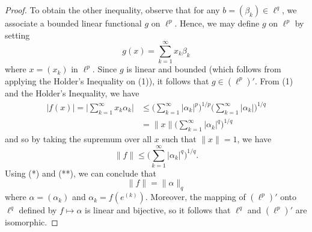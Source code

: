 \documentclass[a4paper]{article}
\begin{document}
\begin{proof}
To obtain the other inequality, observe that for any \( b = ({\beta}_{k}) \in \ell^{q} \), we associate a bounded linear functional \( g  \) on \( \ell^{p} \). Hence, we may define \( g  \) on \( \ell^{p} \) by setting
\[  g(x) = \sum_{ k=1  }^{ \infty  } {x}_{k} {\beta}_{k} \]
where \( x = ({x}_{k}) \) in \( \ell^{p} \). Since \( g  \) is linear and bounded (which follows from applying the Holder's Inequality on (1)), it follows that \( g \in (\ell^{p})' \). From (1) and the Holder's Inequality, we have 
\begin{align*}
    | f(x) |  = \Big| \sum_{ k=1  }^{ \infty  } {x}_{k} {\alpha}_{k } \Big|  &\leq  \Big(  \sum_{ k=1  }^{ \infty  } | {\alpha}_{k} |^{p} \Big)^{1/p} \Big(  \sum_{ k=1  }^{ \infty  } | {\alpha}_{k} | \Big)^{1/q} \\
                                                                             &= \|x\| \Big(  \sum_{ k=1  }^{ \infty  } | {\alpha}_{k} |^{q} \Big)^{1/q}  
\end{align*}
and so by taking the supremum over all \( x  \) such that \( \|x\| = 1  \), we have
\[  \|f\| \leq \Big(  \sum_{ k=1  }^{ \infty  } | {\alpha}_{k} |^{q} \Big)^{1/q}. \tag{**} \]
Using (*) and (**), we can conclude that 
\[  \|f\| = \|\alpha\|_q \]
where \( \alpha = ({\alpha}_{k}) \) and \( {\alpha}_{k} = f(e^{(k)}) \). Moreover, the mapping of \( (\ell^{p})' \) onto \( \ell^{q} \) defined by \( f \mapsto \alpha \) is linear and bijective, so it follows that \( \ell^{q}  \) and \( (\ell^{p})' \) are isomorphic.
\end{proof}
\end{document}
